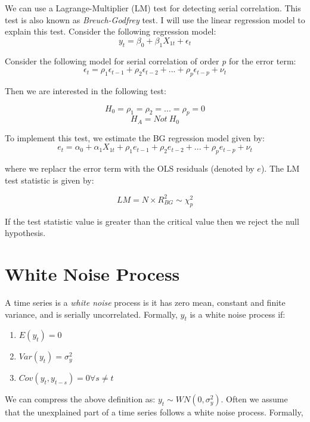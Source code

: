 \documentclass[]{book}
\providecommand{\tightlist}{%
  \setlength{\itemsep}{0pt}\setlength{\parskip}{0pt}}
\theoremstyle{definition}
\theoremstyle{definition}
\theoremstyle{definition}
\theoremstyle{remark}
\begin{document}
We can use a Lagrange-Multiplier (LM) test for detecting serial correlation. This test is also known as \emph{Breuch-Godfrey} test. I will use the linear regression model to explain this test. Consider the following regression model:
\begin{equation}
y_t=\beta_0 + \beta_1 X_{1t}+\epsilon_t
\end{equation}

Consider the following model for serial correlation of order \emph{p} for the error term:
\begin{equation}
\epsilon_t=\rho_1 \epsilon_{t-1}+\rho_2 \epsilon_{t-2}+...+ \rho_p \epsilon_{t-p}+\nu_t
\label{eq:bg}
\end{equation}

Then we are interested in the following test:

\[H_0=\rho_1=\rho_2=...=\rho_p=0 \]
\[H_A = Not \ H_0 \]

To implement this test, we estimate the BG regression model given by:
\begin{equation}
e_t=\alpha_0 + \alpha_1 X_{1t}+ \rho_1 e_{t-1}+\rho_2 e_{t-2}+...+ \rho_p e_{t-p}+\nu_t
\label{eq:bg1}
\end{equation}

where we replacr the error term with the OLS residuals (denoted by \(e\)). The LM test statistic is given by:

\[ LM  = N\times R^2_{BG}  \sim \chi^2_p  \]

If the test statistic value is greater than the critical value then we reject the null hypothesis.

\hypertarget{white-noise-process}{%
\section{White Noise Process}\label{white-noise-process}}

A time series is a \emph{white noise} process is it has zero mean, constant and finite variance, and is serially uncorrelated. Formally, \(y_t\) is a white noise process if:

\begin{enumerate}
\def\labelenumi{\arabic{enumi}.}
\tightlist
\item
  \(E(y_t)=0\)
\item
  \(Var(y_t)=\sigma^2_y\)
\item
  \(Cov(y_t,y_{t-s})= 0 \forall s\neq t\)
\end{enumerate}

We can compress the above definition as: \(y_t\sim WN(0,\sigma^2_y)\).
Often we assume that the unexplained part of a time series follows a white noise process. Formally,
\end{document}
